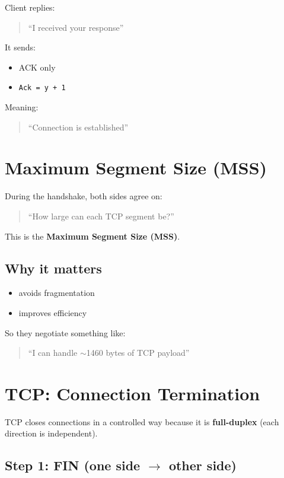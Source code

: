Client replies:

\begin{quote}
“I received your response”
\end{quote}

It sends:
\begin{itemize}
    \item ACK only
    \item \texttt{Ack = y + 1}
\end{itemize}

Meaning:
\begin{quote}
“Connection is established”
\end{quote}

\section{Maximum Segment Size (MSS)}

During the handshake, both sides agree on:

\begin{quote}
“How large can each TCP segment be?”
\end{quote}

This is the \textbf{Maximum Segment Size (MSS)}.

\subsection*{Why it matters}

\begin{itemize}
    \item avoids fragmentation
    \item improves efficiency
\end{itemize}

So they negotiate something like:
\begin{quote}
“I can handle $\sim$1460 bytes of TCP payload”
\end{quote}

\section{TCP: Connection Termination}

TCP closes connections in a controlled way because it is \textbf{full-duplex} (each direction is independent).

\subsection{Step 1: FIN (one side $\rightarrow$ other side)}

